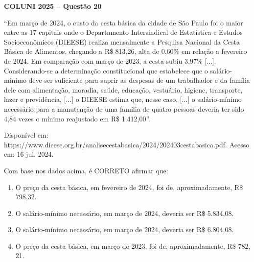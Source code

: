 \textbf{COLUNI 2025 -- Questão 20}\par\medskip “Em março de 2024, o custo da cesta básica da cidade de São Paulo foi o maior entre as 17 capitais onde o Departamento Intersindical de Estatística e Estudos Socioeconômicos (DIEESE) realiza mensalmente a Pesquisa Nacional da Cesta Básica de Alimentos, chegando a R\$ 813,26, alta de 0,60\% em relação a fevereiro de 2024. Em comparação com março de 2023, a cesta subiu 3,97\% [...]. Considerando-se a determinação constitucional que estabelece que o salário-mínimo deve ser suficiente para suprir as despesas de um trabalhador e da família dele com alimentação, moradia, saúde, educação, vestuário, higiene, transporte, lazer e previdência, [...] o DIEESE estima que, nesse caso, [...] o salário-mínimo necessário para a manutenção de uma família de quatro pessoas deveria ter sido 4,84 vezes o mínimo reajustado em R\$ 1.412,00”.

\noindent Disponível em: https://www.dieese.org.br/analisecestabasica/2024/202403cestabasica.pdf. Acesso em: 16 jul. 2024.

\par

Com base nos dados acima, é CORRETO afirmar que:
\begin{enumerate}
\item O preço da cesta básica, em fevereiro de 2024, foi de, aproximadamente, R\$ 798,32.
\item O salário-mínimo necessário, em março de 2024, deveria ser R\$ 5.834,08.
\item O salário-mínimo necessário, em março de 2024, deveria ser R\$ 6.804,08.
\item O preço da cesta básica, em março de 2023, foi de, aproximadamente, R\$ 782, 21.
\end{enumerate}
